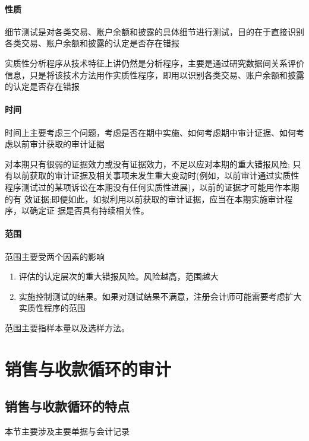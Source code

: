 \documentclass[UTF8,12pt]{ctexart}
\numberwithin{equation}{section} %
\numberwithin{figure}{section}
\numberwithin{table}{section}
\begin{document}
	\paragraph{性质}
	细节测试是对各类交易、账户余额和披露的具体细节进行测试，目的在于直接识别各类交易、账户余额和披露的认定是否存在错报
	
	实质性分析程序从技术特征上讲仍然是分析程序，主要是通过研究数据间关系评价信息，只是将该技术方法用作实质性程序，即用以识别各类交易、账户余额和披露的认定是否存在错报
	
	\paragraph{时间}
	时间上主要考虑三个问题，考虑是否在期中实施、如何考虑期中审计证据、如何考虑以前审计获取的审计证据
	
	对本期只有很弱的证据效力或没有证据效力，不足以应对本期的重大错报风险; 只有以前获取的审计证据及相关事项未发生重大变动时(例如，以前审计通过实质性程序测试过的某项诉讼在本期没有任何实质性进展)，以前的证据才可能用作本期的有 效证据;即便如此，如拟利用以前获取的审计证据，应当在本期实施审计程序，以确定证 据是否具有持续相关性。
	
	\paragraph{范围}
	范围主要受两个因素的影响
	\begin{enumerate}
		\item 评估的认定层次的重大错报风险。风险越高，范围越大
		
		\item 实施控制测试的结果。如果对测试结果不满意，注册会计师可能需要考虑扩大实质性程序的范围
	\end{enumerate}
	
	范围主要指样本量以及选样方法。	
	
	\newpage
	\section{销售与收款循环的审计}
	\subsection{销售与收款循环的特点}
	本节主要涉及主要单据与会计记录
	
\end{document}
